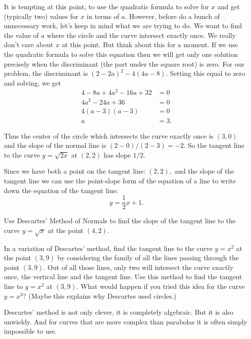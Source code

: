 \begin{myexample}
It is tempting at this point, to use the quadratic formula to solve
for $x$ and get (typically two) values for $x$ in terms of $a.$
However, before do a bunch of unnecessary work, let's keep in mind
what we are trying to do.  We want to find the value of $a$ where the
circle and the curve intersect exactly once.  We really don't care
about $x$ at this point.  But think about this for a moment. If we use
the quadratic formula to solve this equation then we will get only one
solution precisely when the discriminant (the part under the square
root) is zero.  For our problem, the discriminant is
$(2-2a)^2-4(4a-8).$ Setting this equal to zero and solving, we get
\begin{align*}
  4-8a+4a^2-16a+32&=0\\
  4a^2-24a+36&=0\\
  4(a-3)(a-3)&=0\\
  a&=3.
\end{align*}

 Thus the center of the circle which intersects the curve exactly once
 is $(3,0)$ and the slope of the normal line is  $(2-0)/(2-3)=-2.$
 So the tangent line to the curve $y=\sqrt{2x}$ at $(2,2)$ has slope
 $1/2.$  

 Since we have both a point on the tangent line: $(2,2),$ and the
 slope of the tangent line we can use the point-slope form of the
 equation of a line to write down the equation of the tangent
 line: $$y=\frac{1}{2}x+1.$$
\end{myexample}

 \begin{embeddedproblem}{}
   Use Descartes' Method of Normals to find the slope of the tangent
   line to the curve $y=\sqrt{x}$ at the point $(4,2).$
 \end{embeddedproblem}

 \begin{embeddedproblem}{}
   In a variation of Descartes' method, find the tangent line to the
   curve $y=x^2$ at the point $(3,9)$ by considering the family of all
   the lines passing through the point $(3,9).$ Out of all those lines, only
   two will intersect the curve exactly once, the vertical line and
   the tangent line.  Use this method to find the tangent line to
   $y=x^2$ at $(3,9).$ What would happen if you tried this idea for
   the curve $y=x^3?$ (Maybe this explains why Descartes used
   circles.)
 \end{embeddedproblem}

 Descartes' method is not only clever, it is completely algebraic.
 But it is also unwieldy. And for curves that are more complex than
 parabolas it is often simply impossible to use.

